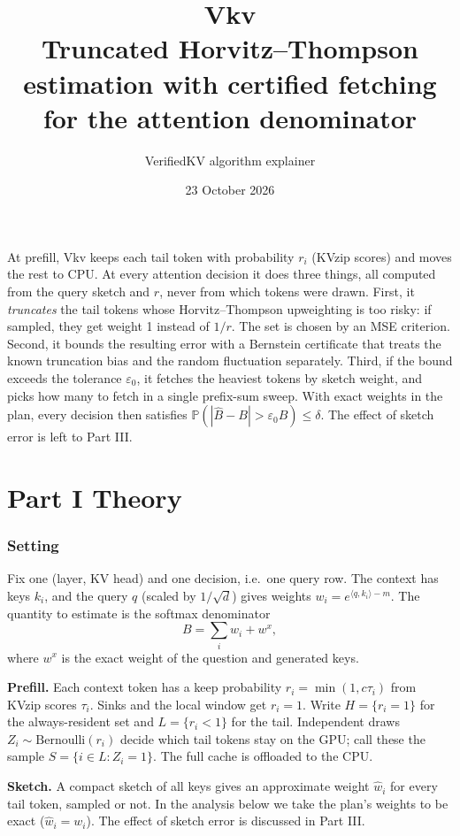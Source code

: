 \documentclass[11pt]{article}
\title{\textbf{Vkv}\\[2pt]\large Truncated Horvitz--Thompson estimation with certified fetching for the attention denominator}
\author{VerifiedKV algorithm explainer}
\date{23 October 2026}
\newcommand{\eps}{\varepsilon}
\theoremstyle{definition}
\theoremstyle{remark}
\begin{document}
\maketitle

At prefill, Vkv keeps each tail token with probability $r_i$ (KVzip scores) and moves the rest to CPU. At every attention
decision it does three things, all computed from the query sketch and $r$, never from which tokens were drawn. First, it
\emph{truncates} the tail tokens whose Horvitz--Thompson upweighting is too risky: if sampled, they get weight 1 instead of
$1/r$. The set is chosen by an MSE criterion. Second, it bounds the resulting error with a Bernstein certificate that treats
the known truncation bias and the random fluctuation separately. Third, if the bound exceeds the tolerance $\eps_0$, it
fetches the heaviest tokens by sketch weight, and picks how many to fetch in a single prefix-sum sweep. With exact weights
in the plan, every decision then satisfies $\mathbb P(|\hat B - B| > \eps_0 B) \le \delta$. The effect of sketch error is
left to Part III.

\part*{Part I \quad Theory}

\section{Setting}

Fix one (layer, KV head) and one decision, i.e.\ one query row. The context has keys $k_i$, and the query $q$ (scaled by
$1/\sqrt d$) gives weights $w_i = e^{\langle q, k_i\rangle - m}$. The quantity to estimate is the softmax denominator
\[ B = \sum_i w_i + w^x, \]
where $w^x$ is the exact weight of the question and generated keys.

\textbf{Prefill.} Each context token has a keep probability $r_i = \min(1, c\tau_i)$ from KVzip scores $\tau_i$. Sinks and
the local window get $r_i = 1$. Write $H = \{r_i = 1\}$ for the always-resident set and $L = \{r_i < 1\}$ for the tail.
Independent draws $Z_i \sim \mathrm{Bernoulli}(r_i)$ decide which tail tokens stay on the GPU; call these the sample
$S = \{i \in L : Z_i = 1\}$. The full cache is offloaded to the CPU.

\textbf{Sketch.} A compact sketch of all keys gives an approximate weight $\hat w_i$ for every tail token, sampled or not.
In the analysis below we take the plan's weights to be exact ($\hat w_i = w_i$). The effect of sketch error is discussed
in Part III.
\end{document}
